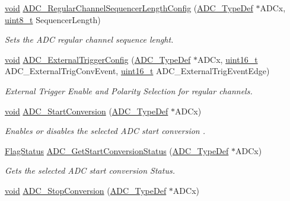 \begin{DoxyCompactItemize}
\hyperlink{group___n_a_m_e_ga18028b8badbf1ea7e704ccac3c488e82}{void} \hyperlink{group___a_d_c___exported___constants_ga8d8707b4856b617fc709cf840467e5ad}{A\-D\-C\-\_\-\-Regular\-Channel\-Sequencer\-Length\-Config} (\hyperlink{struct_a_d_c___type_def}{A\-D\-C\-\_\-\-Type\-Def} $\ast$A\-D\-Cx, \hyperlink{stdint_8h_aba7bc1797add20fe3efdf37ced1182c5}{uint8\-\_\-t} Sequencer\-Length)
\begin{DoxyCompactList}\small\item\em Sets the A\-D\-C regular channel sequence lenght. \end{DoxyCompactList}\item 
\hyperlink{group___n_a_m_e_ga18028b8badbf1ea7e704ccac3c488e82}{void} \hyperlink{group___a_d_c___exported___constants_ga1b5fdad6677d7f16b58641d9aced48a1}{A\-D\-C\-\_\-\-External\-Trigger\-Config} (\hyperlink{struct_a_d_c___type_def}{A\-D\-C\-\_\-\-Type\-Def} $\ast$A\-D\-Cx, \hyperlink{stdint_8h_a273cf69d639a59973b6019625df33e30}{uint16\-\_\-t} A\-D\-C\-\_\-\-External\-Trig\-Conv\-Event, \hyperlink{stdint_8h_a273cf69d639a59973b6019625df33e30}{uint16\-\_\-t} A\-D\-C\-\_\-\-External\-Trig\-Event\-Edge)
\begin{DoxyCompactList}\small\item\em External Trigger Enable and Polarity Selection for regular channels. \end{DoxyCompactList}\item 
\hyperlink{group___n_a_m_e_ga18028b8badbf1ea7e704ccac3c488e82}{void} \hyperlink{group___a_d_c___exported___constants_gae79cdf81d4ec0d779312dea115e479fa}{A\-D\-C\-\_\-\-Start\-Conversion} (\hyperlink{struct_a_d_c___type_def}{A\-D\-C\-\_\-\-Type\-Def} $\ast$A\-D\-Cx)
\begin{DoxyCompactList}\small\item\em Enables or disables the selected A\-D\-C start conversion . \end{DoxyCompactList}\item 
\hyperlink{group___exported__types_ga89136caac2e14c55151f527ac02daaff}{Flag\-Status} \hyperlink{group___a_d_c___exported___constants_ga9d880667c84176493e0f4c1ed3a40ace}{A\-D\-C\-\_\-\-Get\-Start\-Conversion\-Status} (\hyperlink{struct_a_d_c___type_def}{A\-D\-C\-\_\-\-Type\-Def} $\ast$A\-D\-Cx)
\begin{DoxyCompactList}\small\item\em Gets the selected A\-D\-C start conversion Status. \end{DoxyCompactList}\item 
\hyperlink{group___n_a_m_e_ga18028b8badbf1ea7e704ccac3c488e82}{void} \hyperlink{group___a_d_c___exported___constants_ga872604d9953de5e4059aa3c22b77ed08}{A\-D\-C\-\_\-\-Stop\-Conversion} (\hyperlink{struct_a_d_c___type_def}{A\-D\-C\-\_\-\-Type\-Def} $\ast$A\-D\-Cx)

\end{DoxyCompactItemize}
